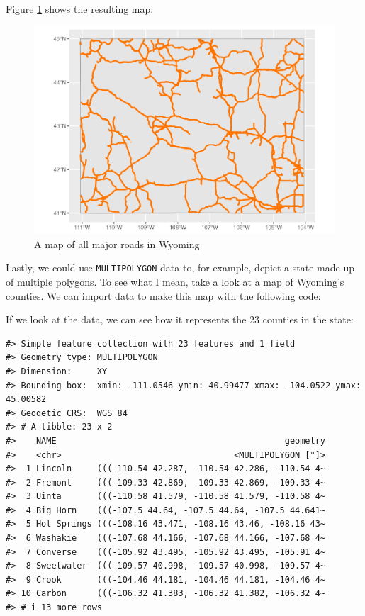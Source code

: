 \documentclass[
]{book}
\begin{document}
Figure \ref{fig:wyoming-roads-map} shows the resulting map.

\begin{figure}
\includegraphics[width=1\linewidth]{maps_files/figure-latex/wyoming-roads-map-1} \caption{A map of all major roads in Wyoming}\label{fig:wyoming-roads-map}
\end{figure}

Lastly, we could use \texttt{MULTIPOLYGON} data to, for example, depict a state made up of multiple polygons. To see what I mean, take a look at a map of Wyoming's counties. We can import data to make this map with the following code:

If we look at the data, we can see how it represents the 23 counties in the state:

\begin{verbatim}
#> Simple feature collection with 23 features and 1 field
#> Geometry type: MULTIPOLYGON
#> Dimension:     XY
#> Bounding box:  xmin: -111.0546 ymin: 40.99477 xmax: -104.0522 ymax: 45.00582
#> Geodetic CRS:  WGS 84
#> # A tibble: 23 x 2
#>    NAME                                             geometry
#>    <chr>                                  <MULTIPOLYGON [°]>
#>  1 Lincoln     (((-110.54 42.287, -110.54 42.286, -110.54 4~
#>  2 Fremont     (((-109.33 42.869, -109.33 42.869, -109.33 4~
#>  3 Uinta       (((-110.58 41.579, -110.58 41.579, -110.58 4~
#>  4 Big Horn    (((-107.5 44.64, -107.5 44.64, -107.5 44.641~
#>  5 Hot Springs (((-108.16 43.471, -108.16 43.46, -108.16 43~
#>  6 Washakie    (((-107.68 44.166, -107.68 44.166, -107.68 4~
#>  7 Converse    (((-105.92 43.495, -105.92 43.495, -105.91 4~
#>  8 Sweetwater  (((-109.57 40.998, -109.57 40.998, -109.57 4~
#>  9 Crook       (((-104.46 44.181, -104.46 44.181, -104.46 4~
#> 10 Carbon      (((-106.32 41.383, -106.32 41.382, -106.32 4~
#> # i 13 more rows
\end{verbatim}
\end{document}
